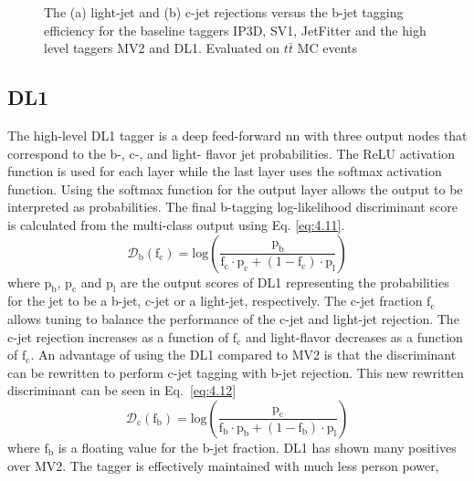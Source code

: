 \begin{figure}[H]
    \caption{ The (a) light-jet and (b) c-jet rejections versus the b-jet tagging efficiency for the baseline taggers IP3D, SV1, JetFitter and the high level taggers MV2 and DL1. Evaluated on $t\bar{t}$ MC events \cite{btag-iden-eff}}
\label{fig:mv2_eff}
\end{figure}

\subsection{DL1}\label{sec:DL1-ch4}

The high-level DL1 tagger is a deep feed-forward \gls{nn} with three output nodes that correspond to the b-, c-, and light- flavor jet probabilities. The ReLU activation function is used 
for each layer while the last layer uses the softmax activation function. Using the softmax function for the output layer allows the output to be interpreted as probabilities. 
The final b-tagging log-likelihood discriminant score is calculated from the multi-class output using Eq. \ref{eq:4.11}.
%
\begin{equation}\label{eq:4.11}
    \mathcal{D}_{\textrm{b}}(\textrm{f}_{\textrm{c}}) = \textrm{log}\left(\frac{\textrm{p}_{\textrm{b}}}{\textrm{f}_{\textrm{c}} \cdot \textrm{p}_{\textrm{c}} + (\textrm{1}-\textrm{f}_{\textrm{c}}) \cdot \textrm{p}_{\textrm{l}} }\right)
\tag{4.11}
\end{equation}
%
where $\textrm{p}_{\textrm{b}}$, $\textrm{p}_{\textrm{c}}$ and $\textrm{p}_{\textrm{l}}$ are the output scores of DL1 representing the probabilities for the jet to be a b-jet, c-jet 
or a light-jet, respectively. The c-jet fraction $\textrm{f}_{\textrm{c}}$ allows tuning to balance the performance of the c-jet and light-jet rejection. The c-jet rejection increases 
as a function of $\textrm{f}_{\textrm{c}}$ and light-flavor decreases as a function of $\textrm{f}_{\textrm{c}}$. An advantage of using the DL1 compared to MV2 is that the 
discriminant can be rewritten to perform c-jet tagging with b-jet rejection. This new rewritten discriminant can be seen in Eq.~\ref{eq:4.12}
%
\begin{equation}\label{eq:4.12}
    \mathcal{D}_{\textrm{c}}(\textrm{f}_{\textrm{b}}) = \textrm{log}\left(\frac{\textrm{p}_{\textrm{c}}}{\textrm{f}_{\textrm{b}} \cdot \textrm{p}_{\textrm{b}} + (\textrm{1}-\textrm{f}_{\textrm{b}}) \cdot \textrm{p}_{\textrm{l}} }\right)
\tag{4.12}
\end{equation}
%
where  $\textrm{f}_{\textrm{b}}$ is a floating value for the b-jet fraction. DL1 has shown many positives over MV2. The tagger is effectively maintained with much less person power,
